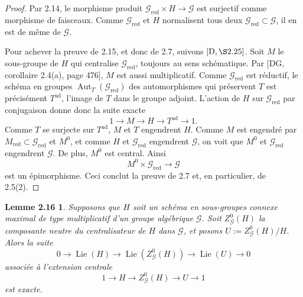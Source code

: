 \documentclass[11pt]{article}
\newcommand{\Lie}{\operatorname{Lie}}
\newcommand{\red}{\mathrm{red}}
\newtheorem*{lemme216}{Lemme 2.16}
\newcommand{\Aut}{\operatorname{Aut}}
\begin{document}
\begin{proof}
Par 2.14, le morphisme produit \(\mathcal G_{\red}\times H\to\mathcal G\) est surjectif
comme morphisme de faisceaux. Comme \(\mathcal G_{\red}\) et \(H\) normalisent tous deux
\(\mathcal G_{\red}\subset\mathcal G\), il en est de même de \(\mathcal G\).

Pour achever la preuve de 2.15, et donc de 2.7, suivons \([\mathrm D,\S2.25]\). Soit
\(M\) le sous-groupe de \(H\) qui centralise \(\mathcal G_{\red}\), toujours au sens
schématique. Par \([\mathrm{DG},\) corollaire 2.4(a), page 476], \(M\) est aussi
multiplicatif. Comme \(\mathcal G_{\red}\) est réductif, le schéma en groupes
\(\Aut_T(\mathcal G_{\red})\) des automorphismes qui préservent \(T\) est précisément
\(T^{\mathrm{ad}}\), l'image de \(T\) dans le groupe adjoint. L'action de \(H\) sur
\(\mathcal G_{\red}\) par conjugaison donne donc la suite exacte
\begin{equation}
  1\longrightarrow M\longrightarrow H\longrightarrow T^{\mathrm{ad}}\longrightarrow 1.
  \tag{2.15.1}
\end{equation}
Comme \(T\) se surjecte sur \(T^{\mathrm{ad}}\), \(M\) et \(T\) engendrent \(H\). Comme
\(M\) est engendré par \(M_{\red}\subset\mathcal G_{\red}\) et \(M^0\), et comme \(H\)
et \(\mathcal G_{\red}\) engendrent \(\mathcal G\), on voit que \(M^0\) et
\(\mathcal G_{\red}\) engendrent \(\mathcal G\). De plus, \(M^0\) est central. Ainsi
\begin{equation}
  M^0\times\mathcal G_{\red}\longrightarrow\mathcal G
  \tag{2.15.2}
\end{equation}
est un épimorphisme. Ceci conclut la preuve de 2.7 et, en particulier, de 2.5(2).
\end{proof}

\begin{lemme216}
Supposons que \(H\) soit un schéma en sous-groupes connexe maximal de type
multiplicatif d'un groupe algébrique \(\mathcal G\). Soit \(Z^0_{\mathcal G}(H)\) la
composante neutre du centralisateur de \(H\) dans \(\mathcal G\), et posons
\(U:=Z^0_{\mathcal G}(H)/H\). Alors la suite
\begin{equation}
0\longrightarrow \Lie(H)\longrightarrow\Lie(Z^0_{\mathcal G}(H))
\longrightarrow\Lie(U)\longrightarrow0
\tag{2.16.1}
\end{equation}
associée à l'extension centrale
\begin{equation}
1\longrightarrow H\longrightarrow Z^0_{\mathcal G}(H)\longrightarrow U
\longrightarrow1
\tag{2.16.2}
\end{equation}
est exacte.
\end{lemme216}
\end{document}
